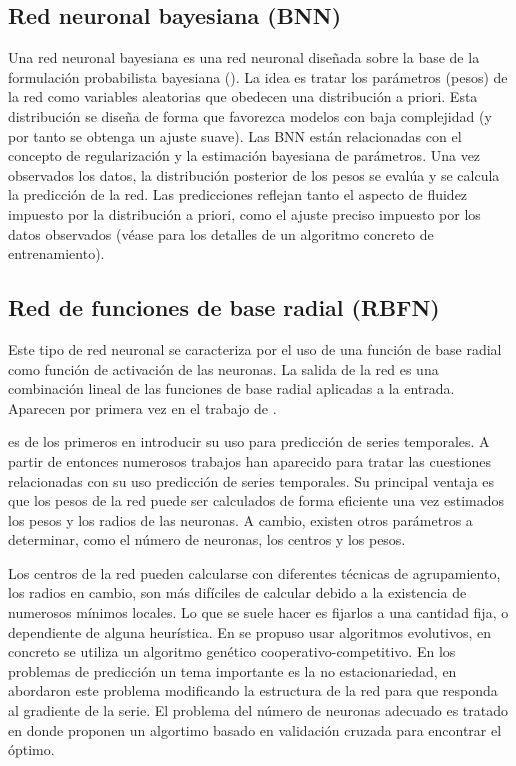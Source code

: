 \documentclass{llncs}
\begin{document}
\subsection{Red neuronal bayesiana (BNN)}
Una red neuronal bayesiana es una red neuronal diseñada sobre la base de la formulación probabilista bayesiana (\cite{mackay1992bayesian}). La idea es tratar los parámetros (pesos) de la red como variables aleatorias que obedecen una distribución a priori. Esta distribución se diseña de forma que favorezca modelos con baja complejidad (y por tanto se obtenga un ajuste suave). Las BNN están relacionadas con el concepto de regularización y la estimación bayesiana de parámetros. Una vez observados los datos, la distribución posterior de los pesos se evalúa y se calcula la predicción de la red. Las predicciones reflejan tanto el aspecto de fluidez impuesto por la distribución a priori, como el ajuste preciso impuesto por los datos observados (véase \cite{dan1997gauss} para los detalles de un algoritmo concreto de entrenamiento).

\subsection{Red de funciones de base radial (RBFN)}
Este tipo de red neuronal se caracteriza por el uso de una función de base radial como función de activación de las neuronas. La salida de la red es una combinación lineal de las funciones de base radial aplicadas a la entrada. Aparecen por primera vez en el trabajo de \cite{broomhead1988radial}. 

\cite{chen1991orthogonal} es de los primeros en introducir su uso para predicción de series temporales. A partir de entonces numerosos trabajos han aparecido para tratar las cuestiones relacionadas con su uso predicción de series temporales. Su principal ventaja es que los pesos de la red puede ser calculados de forma eficiente una vez estimados los pesos y los radios de las neuronas. A cambio, existen otros parámetros a determinar, como el número de neuronas, los centros y los pesos.

Los centros de la red pueden calcularse con diferentes técnicas de agrupamiento, los radios en cambio, son más difíciles de calcular debido a la existencia de numerosos mínimos locales. Lo que se suele hacer es fijarlos a una cantidad fija, o dependiente de alguna heurística. En \cite{whitehead1996cooperative} se propuso usar algoritmos evolutivos, en concreto se utiliza un algoritmo genético cooperativo-competitivo. En los problemas de predicción un tema importante es la no estacionariedad, en \cite{chng1996gradient} abordaron este problema modificando la estructura de la red para que responda al gradiente de la serie. El problema del número de neuronas adecuado es tratado en \cite{leung2001prediction} donde proponen un algortimo basado en validación cruzada para encontrar el óptimo.
\end{document}
